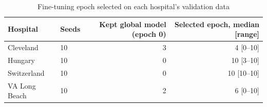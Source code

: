 \begin{table}[ht]
\centering
\small
\caption{Fine-tuning epoch selected on each hospital's validation data}
\label{tab:table6_finetune_epochs}
\begin{tabular}{llrr}
\toprule
Hospital & Seeds & Kept global model (epoch 0) & Selected epoch, median [range] \\
\midrule
Cleveland & 10 & 3 & 4 [0–10] \\
Hungary & 10 & 0 & 10 [3–10] \\
Switzerland & 10 & 0 & 10 [10–10] \\
VA Long Beach & 10 & 2 & 6 [0–10] \\
\bottomrule
\end{tabular}
\end{table}
